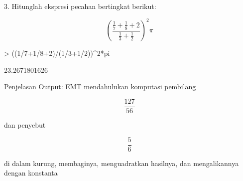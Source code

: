 \documentclass[a4paper,10pt]{article}
\begin{document}
\begin{eulernotebook}
\begin{eulercomment}
3. Hitunglah ekspresi pecahan bertingkat berikut:\\
\end{eulercomment}
\begin{eulerformula}
\[
\left(\frac{\frac{1}{7} + \frac{1}{8} + 2}{\frac{1}{3} + \frac{1}{2}}\right)^2 \pi
\]
\end{eulerformula}
\begin{eulerprompt}
> ((1/7+1/8+2)/(1/3+1/2))^2*pi
\end{eulerprompt}
\begin{euleroutput}
  23.2671801626
\end{euleroutput}
\begin{eulercomment}
Penjelasan Output: EMT mendahulukan komputasi pembilang\\
\end{eulercomment}
\begin{eulerformula}
\[
\frac{127}{56}
\]
\end{eulerformula}
\begin{eulercomment}
dan penyebut\\
\end{eulercomment}
\begin{eulerformula}
\[
\frac{5}{6}
\]
\end{eulerformula}
\begin{eulercomment}
di dalam kurung, membaginya, menguadratkan hasilnya, dan mengalikannya
dengan konstanta


\end{eulercomment}
\end{eulernotebook}
\end{document}
